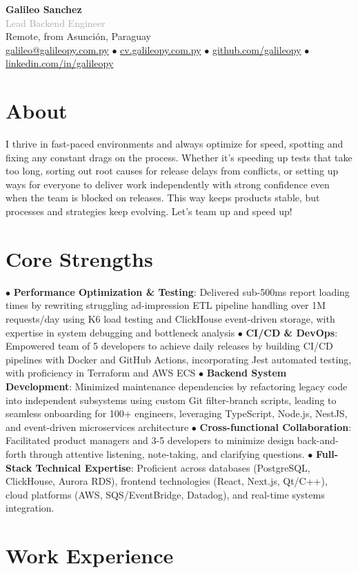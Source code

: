 \documentclass[10pt,a4paper]{article}
\newcommand{\cvheader}[5]{
  \begin{center}
    {\Large \textbf{#1}}\\[0.1em]
    {\normalsize \textcolor{darkgray}{#2}}\\[0.3em]
    
    \footnotesize \textcolor{mediumgray}{#3}\\[0.2em]
    
    \footnotesize
    \href{mailto:#4}{#4} $\bullet$ \href{https://#5}{#5} $\bullet$ 
    \href{https://github.com/galileopy}{github.com/galileopy} $\bullet$ 
    \href{https://www.linkedin.com/in/galileopy}{linkedin.com/in/galileopy}
  \end{center}
  \vspace{0.3em}
}
\begin{document}
\cvheader{Galileo Sanchez}{Lead Backend Engineer}{Remote, from Asunción, Paraguay}{galileo@galileopy.com.py}{cv.galileopy.com.py}

\section{About}
{\footnotesize I thrive in fast-paced environments and always optimize for speed, spotting and fixing any constant drags on the process. Whether it's speeding up tests that take too long, sorting out root causes for release delays from conflicts,  or setting up ways for everyone to deliver work independently with strong confidence even when the team is blocked on releases. This way keeps products stable, but processes and strategies keep evolving. Let's team up and speed up!}

\section{Core Strengths}
{\footnotesize
	$\bullet$ \textbf{Performance Optimization \& Testing}: Delivered sub-500ms report loading times by rewriting struggling ad-impression ETL pipeline handling over 1M requests/day using K6 load testing and ClickHouse event-driven storage, with expertise in system debugging and bottleneck analysis $\bullet$ \textbf{CI/CD \& DevOps}: Empowered team of 5 developers to achieve daily releases by building CI/CD pipelines with Docker and GitHub Actions, incorporating Jest automated testing, with proficiency in Terraform and AWS ECS $\bullet$ \textbf{Backend System Development}: Minimized maintenance dependencies by refactoring legacy code into independent subsystems using custom Git filter-branch scripts, leading to seamless onboarding for 100+ engineers, leveraging TypeScript, Node.js, NestJS, and event-driven microservices architecture $\bullet$ \textbf{Cross-functional Collaboration}: Facilitated product managers and 3-5 developers to minimize design back-and-forth through attentive listening, note-taking, and clarifying questions. $\bullet$ \textbf{Full-Stack Technical Expertise}: Proficient across databases (PostgreSQL, ClickHouse, Aurora RDS), frontend technologies (React, Next.js, Qt/C++), cloud platforms (AWS, SQS/EventBridge, Datadog), and real-time systems integration.
}

\section{Work Experience}
\end{document}
